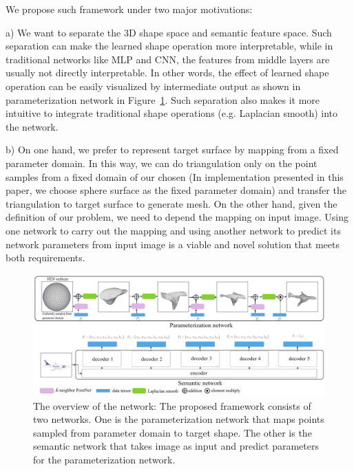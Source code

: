 We propose such framework under two major motivations:

a) We want to separate the 3D shape space and semantic feature space. Such separation can make the learned shape operation more interpretable, while in traditional networks like MLP and CNN, the features from middle layers are usually not directly interpretable. In other words, the effect of learned shape operation can be easily visualized by intermediate output as shown in parameterization network in Figure~\ref{fig:overview}. Such separation also makes it more intuitive to integrate traditional shape operations (e.g. Laplacian smooth) into the network.

b) On one hand, we prefer to represent target surface by mapping from a fixed parameter domain. In this way, we can do triangulation only on the point samples from a fixed domain of our chosen (In implementation presented in this paper, we choose sphere surface as the fixed parameter domain) and transfer the triangulation to target surface to generate mesh. On the other hand, given the definition of our problem, we need to depend the mapping on input image. Using one network to carry out the mapping and using another network to predict its network parameters from input image is a viable and novel solution that meets both requirements.

\begin{figure}[htbp]
	\centering
	\includegraphics[width=\linewidth]{img/net/overview}
	\caption{The overview of the network: The proposed framework consists of two networks. One is the parameterization network that maps points sampled from parameter domain to target shape. The other is the semantic network that takes image as input and predict parameters for the parameterization network.}
	\label{fig:overview}
\end{figure}

